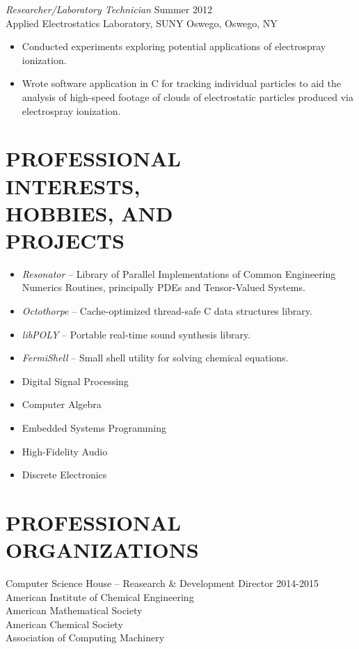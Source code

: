 \documentclass[line,margin]{res}
\begin{document}
\begin{resume}
                {\sl Researcher/Laboratory Technician} \hfill Summer 2012 \\
                Applied Electrostatics Laboratory,
                SUNY Oswego, Oswego, NY
                 \begin{itemize}  \itemsep -2pt %
                \item   Conducted experiments exploring potential applications of electrospray ionization.
		\item   Wrote software application in C
			for tracking individual particles
			to aid the analysis of high-speed footage
			of clouds of electrostatic particles
			produced via electrospray ionization.
                \end{itemize}

\section{PROFESSIONAL \\ INTERESTS, \\ HOBBIES, AND \\ PROJECTS}
				\begin{itemize} \itemsep -2pt
				\item	\emph{Resonator} -- Library of Parallel Implementations of Common Engineering Numerics Routines, principally PDEs and Tensor-Valued Systems.
				\item	\emph{Octothorpe} -- Cache-optimized thread-safe C data structures library.
				\item	\emph{libPOLY} -- Portable real-time sound synthesis library.
				\item	\emph{FermiShell} -- Small shell utility for solving chemical equations.
				\item	Digital Signal Processing
				\item	Computer Algebra
				\item	Embedded Systems Programming
				\item	High-Fidelity Audio
				\item	Discrete Electronics
				\end{itemize}

\section{PROFESSIONAL ORGANIZATIONS}
Computer Science House -- Reasearch \& Development Director 2014-2015\\
American Institute of Chemical Engineering\\
American Mathematical Society\\
American Chemical Society\\
Association of Computing Machinery\\

\end{resume}
\end{document}
